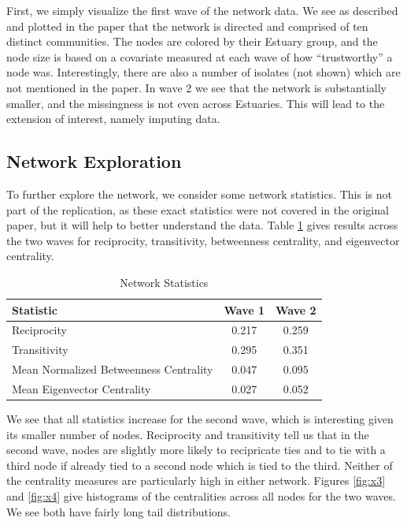 \documentclass[12pt]{article} %
\numberwithin{equation}{section}		%
\numberwithin{figure}{section}			%
\numberwithin{table}{section}				%
\begin{document}
First, we simply visualize the first wave of the network data. We see as described and plotted in the paper that the network is directed and comprised of ten distinct communities. The nodes are colored by their Estuary group, and the node size is based on a covariate measured at each wave of how ``trustworthy'' a node was. Interestingly, there are also a number of isolates (not shown) which are not mentioned in the paper. In wave 2 we see that the network is substantially smaller, and the missingness is not even across Estuaries. This will lead to the extension of interest, namely imputing data.

\subsection{Network Exploration}
To further explore the network, we consider some network statistics. This is not part of the replication, as these exact statistics were not covered in the original paper, but it will help to better understand the data. Table \ref{tab07} gives results across the two waves for reciprocity, transitivity, betweenness centrality, and eigenvector centrality.

\begin{table}[!ht]
 	   \caption{\label{tab07} Network Statistics}
 	\centering
 	\begin{tabular}{lcc}
 		\hline
 		Statistic & Wave 1 & Wave 2 \\ 	
 		\hline
 		Reciprocity & 0.217 & 0.259 \\
 		Transitivity & 0.295 & 0.351 \\
 		Mean Normalized Betweenness Centrality & 0.047 & 0.095 \\
 		Mean Eigenvector Centrality & 0.027 & 0.052 \\
 		\hline
 	\end{tabular}
\end{table}

We see that all statistics increase for the second wave, which is interesting given its smaller number of nodes. Reciprocity and transitivity tell us that in the second wave, nodes are slightly more likely to recipricate ties and to tie with a third node if already tied to a second node which is tied to the third. Neither of the centrality measures are particularly high in either network. Figures \ref{fig:x3} and \ref{fig:x4} give histograms of the centralities across all nodes for the two waves. We see both have fairly long tail distributions.
\end{document}

